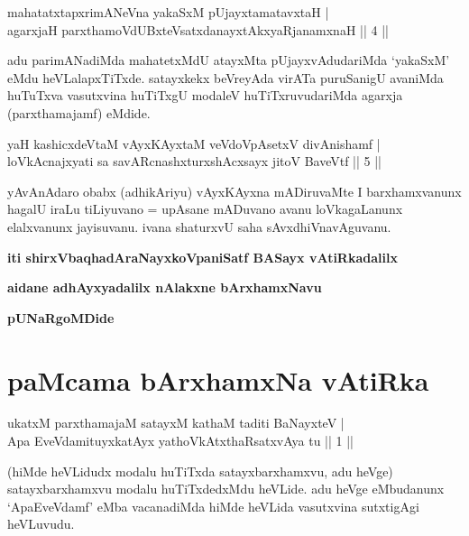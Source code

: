 \begin{shl}
mahatatxtapxrimANeVna yakaSxM pUjayxtamatavxtaH | \\
agarxjaH parxthamoVdUBxteVsatxdanayxtAkxyaRjanamxnaH \hfill ||  4 || 
\end{shl}

\begin{artha}
adu parimANadiMda mahatetxMdU atayxMta pUjayxvAdudariMda `yakaSxM' eMdu heVLalapxTiTxde. satayxkekx beVreyAda virATa puruSanigU avaniMda huTuTxva vasutxvina huTiTxgU modaleV huTiTxruvudariMda agarxja (parxthamajamf) eMdide.
\end{artha}


\begin{shl}
yaH kashicxdeVtaM vAyxKAyxtaM veVdoVpAsetxV divAnishamf | \\
loVkAcnajxyati sa savARcnashxturxshAcxsayx jitoV BaveVtf \hfill ||  5 ||
\end{shl}

\begin{artha}
yAvAnAdaro obabx (adhikAriyu) vAyxKAyxna mADiruvaMte I barxhamxvanunx hagalU iraLu tiLiyuvano = upAsane mADuvano avanu loVkagaLanunx elalxvanunx jayisuvanu. ivana shaturxvU saha sAvxdhiVnavAguvanu.
\end{artha}

\begin{center}
{\bf iti shirxVbaqhadAraNayxkoVpaniSatf BASayx vAtiRkadalilx}
\smallskip

{\bf aidane adhAyxyadalilx nAlakxne bArxhamxNavu}

\smallskip
{\bf pUNaRgoMDide}
\end{center}

\section*{paMcama bArxhamxNa vAtiRka}


\begin{shl}
ukatxM parxthamajaM satayxM kathaM taditi BaNayxteV | \\
Apa EveVdamituyxkatAyx yathoVkAtxthaRsatxvAya tu \hfill ||  1 || 
\end{shl}

\begin{artha}
(hiMde heVLidudx modalu huTiTxda satayxbarxhamxvu, adu heVge) satayxbarxhamxvu modalu huTiTxdedxMdu heVLide. adu heVge eMbudanunx `ApaEveVdamf' eMba vacanadiMda hiMde heVLida vasutxvina sutxtigAgi heVLuvudu.
\end{artha}

